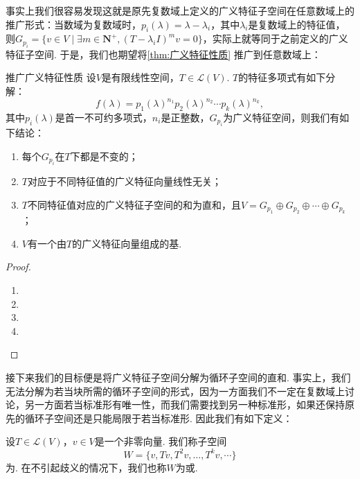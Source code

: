 事实上我们很容易发现这就是原先复数域上定义的广义特征子空间在任意数域上的推广形式：当数域为复数域时，$p_i(\lambda)=\lambda-\lambda_i$，其中$\lambda_i$是复数域上的特征值，则$G_{p_i}=\{v\in V\mid\exists m\in\mathbf{N}^+,(T-\lambda_iI)^mv=0\}$，实际上就等同于之前定义的广义特征子空间. 于是，我们也期望将\autoref{thm:广义特征性质} 推广到任意数域上：
\begin{theorem}{}{推广广义特征性质}
    设$V$是有限线性空间，$T\in \mathcal{L}(V)$. $T$的特征多项式有如下分解：
    \[f(\lambda)=p_1(\lambda)^{n_1}p_2(\lambda)^{n_2}\cdots p_k(\lambda)^{n_k},\]
    其中$p_i(\lambda)$是首一不可约多项式，$n_i$是正整数，$G_{p_i}$为广义特征空间，则我们有如下结论：
    \begin{enumerate}[label=(\arabic*)]
        \item 每个$G_{p_i}$在$T$下都是不变的；
        \item $T$对应于不同特征值的广义特征向量线性无关；
        \item $T$不同特征值对应的广义特征子空间的和为直和，且$V=G_{p_1}\oplus G_{p_2}\oplus\cdots\oplus G_{p_k}$；
        \item $V$有一个由$T$的广义特征向量组成的基.
    \end{enumerate}
\end{theorem}
\begin{proof}
    \begin{enumerate}
        \item
        \item
        \item
        \item
    \end{enumerate}
\end{proof}

接下来我们的目标便是将广义特征子空间分解为循环子空间的直和. 事实上，我们无法分解为若当块所需的循环子空间的形式，因为一方面我们不一定在复数域上讨论，另一方面若当标准形有唯一性，而我们需要找到另一种标准形，如果还保持原先的循环子空间还是只能局限于若当标准形. 因此我们有如下定义：
\begin{definition}{}{}
    设$T\in\mathcal{L}(V)$，$v\in V$是一个非零向量. 我们称子空间
    \[W=\{v,Tv,T^2v,\ldots,T^kv,\cdots\}\]
    为. 在不引起歧义的情况下，我们也称$W$为或.
\end{definition}

